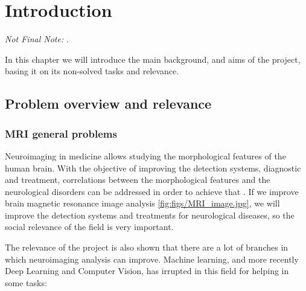 \chapter{Introduction}
\label{chapter:introduccion}

\textit{Not Final Note: }.

In this chapter we will introduce the main background, and aims of the project, basing it on its non-solved tasks and relevance.

\section{Problem overview and relevance}

\subsection{MRI general problems}

Neuroimaging in medicine allows studying the morphological features of the human brain. With the objective of improving the detection systems, diagnostic and treatment, correlations between the morphological features and the neurological disorders can be addressed in order to achieve that \cite{abou2006neuroimaging}. If we improve brain magnetic resonance image analysis \ref{fig:figs/MRI_image.jpg}, we will improve the detection systems and treatments for neurological diseases, so the social relevance of the field is very important.


The relevance of the project is also shown that there are a lot of branches in which neuroimaging analysis can improve. Machine learning, and more recently Deep Learning and Computer Vision, has irrupted in this field for helping in some tasks: 

